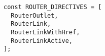 \begin{verbatim}
const ROUTER_DIRECTIVES = [
  RouterOutlet,
  RouterLink,
  RouterLinkWithHref,
  RouterLinkActive,
];
\end{verbatim}
